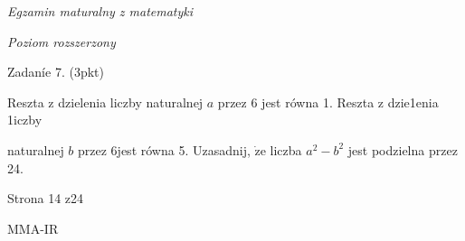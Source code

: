 \documentclass[a4paper,12pt]{article}
\begin{document}
{\it Egzamin maturalny z matematyki}

{\it Poziom rozszerzony}

Zadaníe 7. (3pkt)

Reszta z dzielenia liczby naturalnej $a$ przez 6 jest równa 1. Reszta z dzie1enia 1iczby

naturalnej $b$ przez $6$jest równa 5. Uzasadnij, $\dot{\mathrm{z}}\mathrm{e}$ liczba $a^{2}-b^{2}$ jest podzielna przez 24.

Strona 14 z24

MMA-IR
\end{document}
